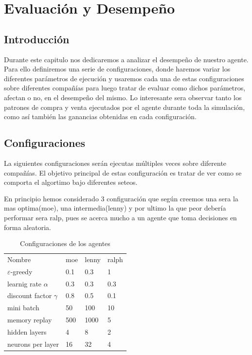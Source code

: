 \chapter{Evaluación y Desempeño}


\section{Introducción}

Durante este capitulo nos dedicaremos a analizar el desempeño de nuestro agente. Para ello definiremos una serie de configuraciones, donde haremos variar los diferentes parámetros de ejecución y usaremos cada una de estas configuraciones sobre diferentes compañías para luego tratar de evaluar como dichos parámetros, afectan o no, en el desempeño del mismo. Lo interesante sera observar tanto los patrones de compra y venta ejecutados por el agente durante toda la simulación, como así también las ganancias obtenidas en cada configuración.

\section{Configuraciones}

La siguientes configuraciones serán ejecutas múltiples veces sobre diferente compañías. El objetivo principal de estas configuración es tratar de ver como se comporta el algortimo bajo diferentes seteos. 

En principio hemos considerado 3 configuración que según creemos una sera la  mas optima(moe), una intermedia(lenny) y por ultimo la que peor debería performar sera ralp, pues se acerca mucho a un agente que toma decisiones en forma aleatoria. 

\begin{table}[]
	\centering
	\caption{Configuraciones de los agentes}
	\label{my-label}
	\begin{tabular}{llll}
		Nombre                     & moe & lenny & ralph \\
		$\varepsilon$-greedy       & 0.1 & 0.3   & 1     \\
		learnig rate    $\alpha$   & 0.3 & 0.3   & 0.3   \\
		discount factor $\gamma$   & 0.8 & 0.5   & 0.1   \\
		mini batch                 & 50  & 100   & 10    \\
		memory replay      		   & 500 & 1000  & 5     \\
		hidden layers     		   & 4   & 8     & 2     \\
		neurons per layer  		   & 16  & 32    & 4    
	\end{tabular}
\end{table}

